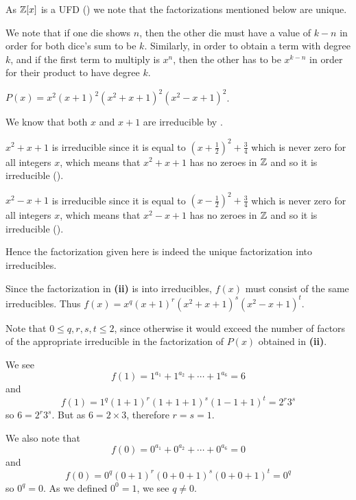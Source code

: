 \begin{questions}
    \item As $\mathbb{Z}[x]$ is a UFD () we note that the factorizations mentioned below are unique.
    \begin{partquestions}{\roman*}
        \item We note that if one die shows $n$, then the other die must have a value of $k - n$ in order for both dice's sum to be $k$. Similarly, in order to obtain a term with degree $k$, and if the first term to multiply is $x^n$, then the other has to be $x^{k-n}$ in order for their product to have degree $k$.

        \item $P(x) = x^2(x+1)^2(x^2+x+1)^2(x^2-x+1)^2$.

        We know that both $x$ and $x+1$ are irreducible by .

        $x^2+x+1$ is irreducible since it is equal to $(x+\frac12)^2 + \frac34$ which is never zero for all integers $x$, which means that $x^2+x+1$ has no zeroes in $\mathbb{Z}$ and so it is irreducible ().

        $x^2-x+1$ is irreducible since it is equal to $(x-\frac12)^2 + \frac34$ which is never zero for all integers $x$, which means that $x^2-x+1$ has no zeroes in $\mathbb{Z}$ and so it is irreducible ().

        Hence the factorization given here is indeed the unique factorization into irreducibles.

        \item Since the factorization in \textbf{(ii)} is into irreducibles, $f(x)$ must consist of the same irreducibles. Thus $f(x) = x^q(x+1)^r(x^2+x+1)^s(x^2-x+1)^t$.

        Note that $0 \leq q,r,s,t \leq 2$, since otherwise it would exceed the number of factors of the appropriate irreducible in the factorization of $P(x)$ obtained in \textbf{(ii)}.

        \item We see
        \[
            f(1) = 1^{a_1} + 1^{a_2} + \cdots + 1^{a_6} = 6
        \]
        and
        \[
            f(1) = 1^q(1+1)^r(1+1+1)^s(1-1+1)^t = 2^r3^s
        \]
        so $6 = 2^r3^s$. But as $6 = 2 \times 3$, therefore $r = s = 1$.

        We also note that
        \[
            f(0) = 0^{a_1} + 0^{a_2} + \cdots + 0^{a_6} = 0
        \]
        and
        \[
            f(0) = 0^q(0+1)^r(0+0+1)^s(0+0+1)^t = 0^q
        \]
        so $0^q = 0$. As we defined $0^0 = 1$, we see $q \neq 0$.


\end{partquestions}
\end{questions}
